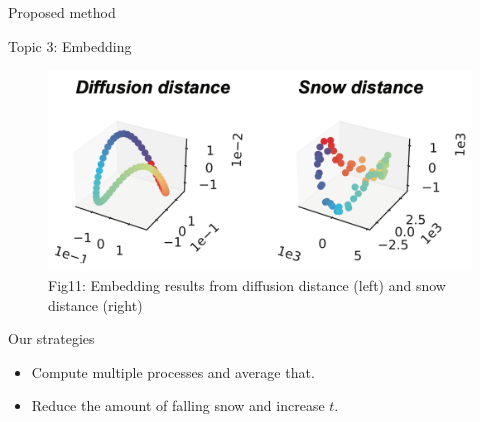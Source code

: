 \documentclass[
  ignorenonframetext,
]{beamer}
\providecommand{\tightlist}{%
  \setlength{\itemsep}{0pt}\setlength{\parskip}{0pt}}\usepackage{longtable,booktabs,array}
\begin{document}
\begin{frame}{Proposed method}
\label{proposed-method-4}
\begin{block}{Topic 3: Embedding}
\label{topic-3-embedding}
\begin{figure}[H]

{\centering \includegraphics{Beamer_files/figure-beamer/8683c9db-2fa6-49e6-95a4-7597b31595ca-1-157cf8b1-35f3-4a36-9141-b40be68b343a.png}

}

\caption{Fig11: Embedding results from diffusion distance (left) and
snow distance (right)}

\end{figure}%

\begin{block}{Our strategies}
\label{our-strategies-1}
\begin{itemize}
\tightlist
\item
  Compute multiple processes and average that.
\item
  Reduce the amount of falling snow and increase \(t\).
\end{itemize}
\end{block}
\end{block}
\end{frame}
\end{document}
